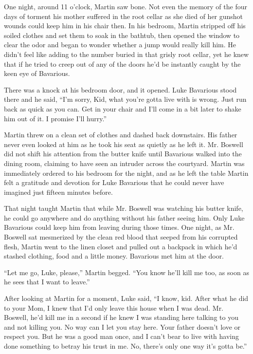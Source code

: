 One night, around 11 o'clock, Martin saw bone. Not even the memory
of the four days of torment his mother suffered in the root cellar
as she died of her gunshot wounds could keep him in his chair then.
In his bedroom, Martin stripped off his soiled clothes and set them
to soak in the bathtub, then opened the window to clear the odor
and began to wonder whether a jump would really kill him. He didn't
feel like adding to the number buried in that grisly root cellar,
yet he knew that if he tried to creep out of any of the doors he'd
be instantly caught by the keen eye of Bavarious.



There was a knock at his bedroom door, and it opened. Luke
Bavarious stood there and he said, ``I'm sorry, Kid, what you're
gotta live with is wrong. Just run back as quick as you can. Get in
your chair and I'll come in a bit later to shake him out of it. I
promise I'll hurry.''



Martin threw on a clean set of clothes and dashed back downstairs.
His father never even looked at him as he took his seat as quietly
as he left it. Mr. Boswell did not shift his attention from the
butter knife until Bavarious walked into the dining room, claiming
to have seen an intruder across the courtyard. Martin was
immediately ordered to his bedroom for the night, and as he left
the table Martin felt a gratitude and devotion for Luke Bavarious
that he could never have imagined just fifteen minutes
before.



That night taught Martin that while Mr. Boswell was watching his
butter knife, he could go anywhere and do anything without his
father seeing him. Only Luke Bavarious could keep him from leaving
during those times. One night, as Mr. Boswell sat mesmerized by the
clean red blood that seeped from his corrupted flesh, Martin went
to the linen closet and pulled out a backpack in which he'd stashed
clothing, food and a little money. Bavarious met him at the
door.



``Let me go, Luke, please,'' Martin begged. ``You know he'll kill me
too, as soon as he sees that I want to leave.''



After looking at Martin for a moment, Luke said, ``I know, kid.
After what he did to your Mom, I knew that I'd only leave this
house when I was dead. Mr. Boswell, he'd kill me in a second if he
knew I was standing here talking to you and not killing you. No way
can I let you stay here. Your father doesn't love or respect you.
But he was a good man once, and I can't bear to live with having
done something to betray his trust in me. No, there's only one way
it's gotta be.''



